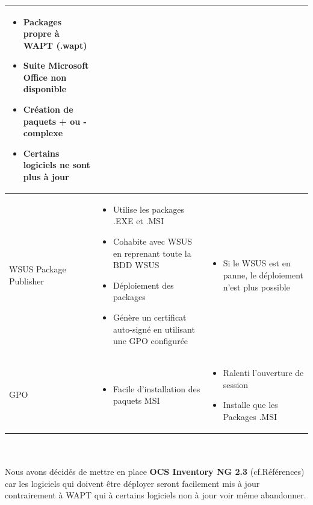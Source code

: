 \documentclass[11pt,a4paper,oneside]{article}
\begin{document}
\begin{tabular}{|p{3.1cm}|p{6.5cm}|p{6.5cm}|}
\begin{itemize}
												\item Packages propre à WAPT (.wapt)
												\item Suite Microsoft Office non disponible
												\item Création de paquets + ou - complexe
												\item Certains logiciels ne sont plus à jour			
										\end{itemize} \\
	\hline
	\centering WSUS Package Publisher  & \begin{itemize}
							\item Utilise les packages .EXE et .MSI 
							\item Cohabite avec WSUS en reprenant toute la BDD WSUS					
							\item Déploiement des packages
							\item Génère un certificat auto-signé en utilisant une GPO configurée
									\end{itemize} & \begin{itemize}
												\item  Si le WSUS est en panne, le déploiement n'est plus possible									
										\end{itemize} \\
	\hline
	\centering GPO  & \begin{itemize}
							\item Facile d'installation des paquets MSI
																			
						\end{itemize} & \begin{itemize}
												\item Ralenti l'ouverture de session
												\item Installe que les Packages .MSI	
										\end{itemize} \\
	\hline
\end{tabular}
\\ \\
Nous avons décidés de mettre en place \textbf{OCS Inventory NG 2.3} (cf.Références) car les logiciels qui doivent être déployer seront facilement mis à jour contrairement à WAPT qui à certains logiciels non à jour voir même abandonner.
\newpage
\end{document}
